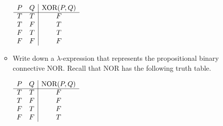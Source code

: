 \documentclass[11pt]{report}
\begin{document}
\begin{enumerate}
\begin{itemize}
				$\begin{array}{ c c | c }			
					P & Q & \text{XOR}(P,Q)\\
					\cline{1 - 3}
					T & T & F \\ 
					T & F & T \\ 
					F & T & T \\ 
					F & F & F
				\end{array}$


			\hspace{12cm}{\bf PTO}
			\newpage
			\item Write down a $\lambda$-expression that represents the propositional binary connective NOR. Recall that NOR has the following truth table.
			
				\vspace{0.5cm}
		
					$\begin{array}{ c c | c }			
						P & Q & \text{NOR}(P,Q)\\
						\cline{1 - 3}
						T & T & F \\ 
						T & F & F \\ 
						F & T & F \\ 
						F & F & T
					\end{array}$		
		\end{itemize}

\end{enumerate}
	
\end{document}
